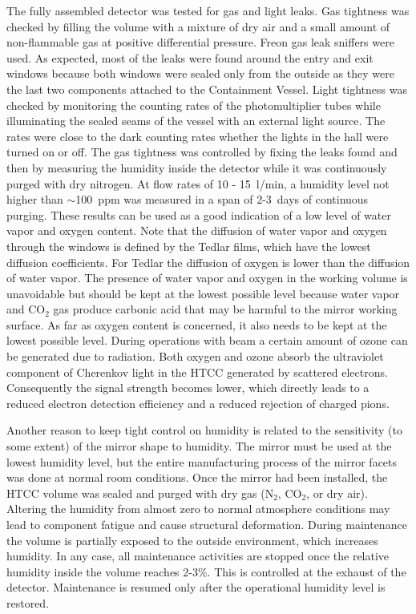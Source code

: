 The fully assembled detector was tested for gas and light leaks. Gas tightness was checked by filling the volume
with a mixture of dry air and a small amount of non-flammable gas at positive differential pressure. Freon gas leak
sniffers were used. As expected, most of the leaks were found around the entry and exit windows because both
windows were sealed only from the outside as they were the last two components attached to the Containment
Vessel. Light tightness was checked by monitoring the counting rates of the photomultiplier tubes while illuminating
the sealed seams of the vessel with an external light source. The rates were close to the dark counting rates whether
the lights in the hall were turned on or off. The gas tightness was controlled by fixing the leaks found and then by
measuring the humidity inside the detector while it was continuously purged with dry nitrogen. At flow rates of
10 - 15~l/min, a humidity level not higher than $\sim$100~ppm was measured in a span of 2-3~days of continuous
purging. These results can be used as a good indication of a low level of water vapor and oxygen content. Note that
the diffusion of water vapor and oxygen through the windows is defined by the Tedlar films, which have the lowest
diffusion coefficients. For Tedlar the diffusion of oxygen is lower than the diffusion of water vapor. The presence of
water vapor and oxygen in the working volume is unavoidable but should be kept at the lowest possible level because
water vapor and CO${_2}$ gas produce carbonic acid that may be harmful to the mirror working surface. As far as
oxygen content is concerned, it also needs to be kept at the lowest possible level. During operations with beam a
certain amount of ozone can be generated due to radiation. Both oxygen and ozone absorb the ultraviolet component
of Cherenkov light in the HTCC generated by scattered electrons. Consequently the signal strength becomes lower,
which directly leads to a reduced electron detection efficiency and a reduced rejection of charged pions.

Another reason to keep tight control on humidity is related to the sensitivity (to some extent) of the mirror shape
to humidity. The mirror must be used at the lowest humidity level, but the entire manufacturing process of the
mirror facets was done at normal room conditions. Once the mirror had been installed, the HTCC volume was sealed
and purged with dry gas (N${_2}$, CO${_2}$, or dry air). Altering the humidity from almost zero to normal
atmosphere conditions may lead to component fatigue and cause structural deformation. During maintenance the
volume is partially exposed to the outside environment, which increases humidity. In any case, all maintenance
activities are stopped once the relative humidity inside the volume reaches 2-3\%. This is controlled at the exhaust
of the detector. Maintenance is resumed only after the operational humidity level is restored.

